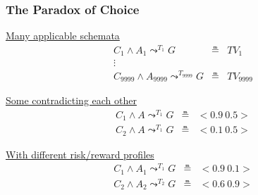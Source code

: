 \documentclass[aspectratio=169]{beamer}
\newcommand{\lpreimp}[1]{\leadsto^{#1}}
\begin{document}
\begin{frame}
  \frametitle{The Paradox of Choice}


  \alert{\underline{Many applicable schemata}}\\
  $$
  \begin{array}{ccc}
    C_1 \land A_1 \lpreimp{T_1} G & \measeq & \textit{TV}_1\\
    \vdots & & \\
    C_{9999} \land A_{9999} \lpreimp{T_{9999}} G & \measeq & \textit{TV}_{9999}
  \end{array}
  $$

  \pause


  \alert{\underline{Some contradicting each other}}\\
  $$
  \begin{array}{ccc}
    C_1 \land A \lpreimp{T_1} G & \measeq & <\!0.9\ 0.5\!>\\
    C_2 \land A \lpreimp{T_1} G & \measeq & <\!0.1\ 0.5\!>
  \end{array}
  $$

  \pause


  \alert{\underline{With different risk/reward profiles}}\\

  $$
  \begin{array}{ccc}
    C_1 \land A_1 \lpreimp{T_1} G & \measeq & <\!0.9\ 0.1\!>\\
    C_2 \land A_2 \lpreimp{T_2} G & \measeq & <\!0.6\ 0.9\!>
  \end{array}
  $$
\end{frame}
\end{document}
